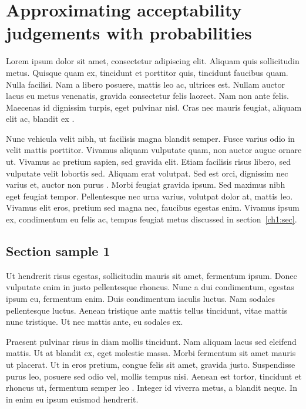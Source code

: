 \chapter{Approximating acceptability judgements with probabilities}

Lorem ipsum dolor sit amet, consectetur adipiscing elit. Aliquam quis sollicitudin metus. Quisque quam ex, tincidunt et porttitor quis, tincidunt faucibus quam. Nulla facilisi. Nam a libero posuere, mattis leo ac, ultrices est. Nullam auctor lacus eu metus venenatis, gravida consectetur felis laoreet. Nam non ante felis. Maecenas id dignissim turpis, eget pulvinar nisl. Cras nec mauris feugiat, aliquam elit ac, blandit ex \cite{article-full}.

Nunc vehicula velit nibh, ut facilisis magna blandit semper. Fusce varius odio in velit mattis porttitor. Vivamus aliquam vulputate quam, non auctor augue ornare ut. Vivamus ac pretium sapien, sed gravida elit. Etiam facilisis risus libero, sed vulputate velit lobortis sed. Aliquam erat volutpat. Sed est orci, dignissim nec varius et, auctor non purus \cite{proceedings-minimal,phdthesis-full}. Morbi feugiat gravida ipsum. Sed maximus nibh eget feugiat tempor. Pellentesque nec urna varius, volutpat dolor at, mattis leo. Vivamus elit eros, pretium sed magna nec, faucibus egestas enim. Vivamus ipsum ex, condimentum eu felis ac, tempus feugiat metus discussed in section~\ref{ch1:sec}.

\section{Section sample 1}

Ut hendrerit risus egestas, sollicitudin mauris sit amet, fermentum ipsum. Donec vulputate enim in justo pellentesque rhoncus. Nunc a dui condimentum, egestas ipsum eu, fermentum enim. Duis condimentum iaculis luctus. Nam sodales pellentesque luctus. Aenean tristique ante mattis tellus tincidunt, vitae mattis nunc tristique. Ut nec mattis ante, eu sodales ex.

Praesent pulvinar risus in diam mollis tincidunt. Nam aliquam lacus sed eleifend mattis. Ut at blandit ex, eget molestie massa. Morbi fermentum sit amet mauris ut placerat. Ut in eros pretium, congue felis sit amet, gravida justo. Suspendisse purus leo, posuere sed odio vel, mollis tempus nisi. Aenean est tortor, tincidunt et rhoncus ut, fermentum semper leo \cite{book-crossref}. Integer id viverra metus, a blandit neque. In in enim eu ipsum euismod hendrerit.

